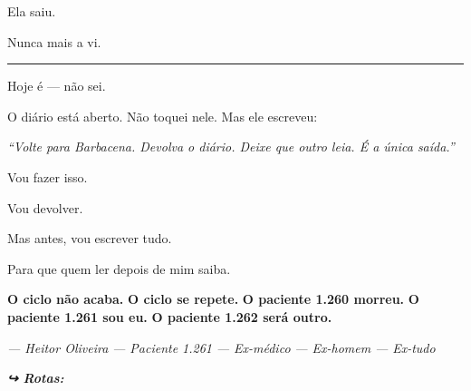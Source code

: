 \noindent Ela saiu.

\noindent Nunca mais a vi.

\vspace{0.5em}\noindent\rule{\textwidth}{0.5pt}\vspace{0.5em}

\noindent Hoje é --- não sei.

\noindent O diário está aberto. Não toquei nele. Mas ele escreveu:

\noindent \textit{\textquotedblleft{}Volte para Barbacena. Devolva o diário. Deixe que outro leia. É a única saída.\textquotedblright{}}

\noindent Vou fazer isso.

\noindent Vou devolver.

\noindent Mas antes, vou escrever tudo.

\noindent Para que quem ler depois de mim saiba.

\noindent \textbf{O ciclo não acaba.}
\textbf{O ciclo se repete.}
\textbf{O paciente 1.260 morreu.}
\textbf{O paciente 1.261 sou eu.}
\textbf{O paciente 1.262 será outro.}

\noindent \textit{--- Heitor Oliveira}
\textit{--- Paciente 1.261}
\textit{--- Ex-médico}
\textit{--- Ex-homem}
\textit{--- Ex-tudo}

\vspace{0.5em}
\noindent\textit{\textbf{↪ Rotas:}  \rotasep {} \rotasep {}}